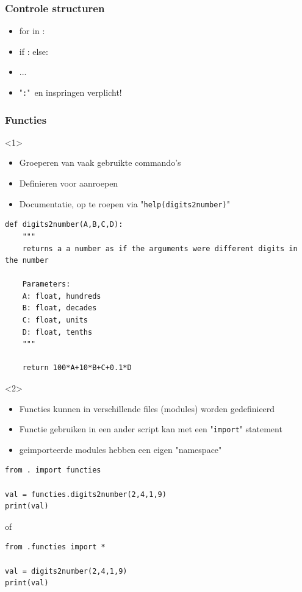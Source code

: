 \documentclass[t]{beamer}
\begin{document}
\begin{frame}
	\frametitle{Controle structuren}
	
	\begin{itemize}
		\item for in :
		\item if : else:  
		\item ...
		\item "\lstinline{:}"\ en inspringen verplicht!
	\end{itemize}
	
	\vspace{1cm}
		
	
\end{frame}
\begin{frame}[fragile]
	\frametitle{Functies}
\begin{onlyenv}<1>
	\begin{itemize}
		\item Groeperen van vaak gebruikte commando's
		\item Definieren voor aanroepen
		\item Documentatie, op te roepen via "\lstinline{help(digits2number)}"
	\end{itemize}

	\begin{lstlisting}
def digits2number(A,B,C,D):
	"""
	returns a a number as if the arguments were different digits in the number
	
	Parameters:
	A: float, hundreds
	B: float, decades
	C: float, units
	D: float, tenths
	"""
	
	return 100*A+10*B+C+0.1*D
	\end{lstlisting}
\end{onlyenv}
\begin{onlyenv}<2>
	\begin{itemize}
		\item Functies kunnen in verschillende files (modules) worden gedefinieerd
		\item Functie gebruiken in een ander script kan met een "\lstinline{import}" statement
		\item geimporteerde modules hebben een eigen "namespace"
	\end{itemize}
	
	\vspace{0.2cm}
	\begin{lstlisting}
from . import functies

val = functies.digits2number(2,4,1,9)
print(val)
	\end{lstlisting}
of
	\begin{lstlisting}
from .functies import *

val = digits2number(2,4,1,9)
print(val)
	\end{lstlisting}
\end{onlyenv}
\end{frame}
\end{document}
